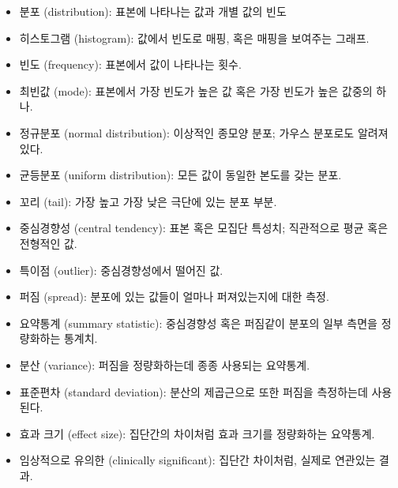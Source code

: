 \begin{itemize}

\item 분포 (distribution): 표본에 나타나는 값과 개별 값의 빈도

\item 히스토그램 (histogram): 값에서 빈도로 매핑, 혹은 매핑을 보여주는 그래프.

\item 빈도 (frequency): 표본에서 값이 나타나는 횟수.

\item 최빈값 (mode): 표본에서 가장 빈도가 높은 값 혹은 가장 빈도가 높은 값중의 하나.

\item 정규분포 (normal distribution): 이상적인 종모양 분포; 가우스 분포로도 알려져 있다.

\item 균등분포 (uniform distribution): 모든 값이 동일한 본도를 갖는 분포.

\item 꼬리 (tail): 가장 높고 가장 낮은 극단에 있는 분포 부분.

\item 중심경향성 (central tendency): 표본 혹은 모집단 특성치; 직관적으로 평균 혹은 전형적인 값.

\item 특이점 (outlier): 중심경향성에서 떨어진 값.

\item 퍼짐 (spread): 분포에 있는 값들이 얼마나 퍼져있는지에 대한 측정.

\item 요약통계 (summary statistic): 
중심경향성 혹은 퍼짐같이 분포의 일부 측면을 정량화하는 통계치.

\item 분산 (variance): 퍼짐을 정량화하는데 종종 사용되는 요약통계.

\item 표준편차 (standard deviation): 분산의 제곱근으로 또한 퍼짐을 측정하는데 사용된다.

\item 효과 크기 (effect size): 집단간의 차이처럼 효과 크기를 정량화하는 요약통계.

\item 임상적으로 유의한 (clinically significant): 집단간 차이처럼, 실제로 연관있는 결과. 

\end{itemize}




